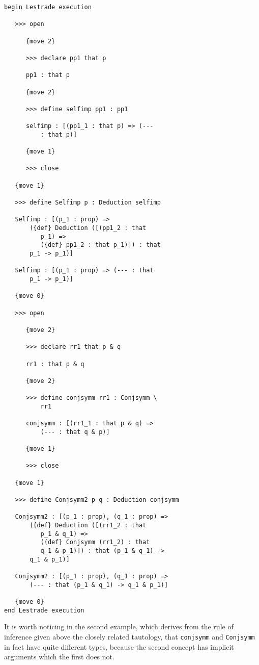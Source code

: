 \documentclass[12pt]{article}
\begin{document}
\begin{verbatim}
begin Lestrade execution

   >>> open

      {move 2}

      >>> declare pp1 that p

      pp1 : that p

      {move 2}

      >>> define selfimp pp1 : pp1

      selfimp : [(pp1_1 : that p) => (--- 
          : that p)]

      {move 1}

      >>> close

   {move 1}

   >>> define Selfimp p : Deduction selfimp

   Selfimp : [(p_1 : prop) => 
       ({def} Deduction ([(pp1_2 : that 
          p_1) => 
          ({def} pp1_2 : that p_1)]) : that 
       p_1 -> p_1)]

   Selfimp : [(p_1 : prop) => (--- : that 
       p_1 -> p_1)]

   {move 0}

   >>> open

      {move 2}

      >>> declare rr1 that p & q

      rr1 : that p & q

      {move 2}

      >>> define conjsymm rr1 : Conjsymm \
          rr1

      conjsymm : [(rr1_1 : that p & q) => 
          (--- : that q & p)]

      {move 1}

      >>> close

   {move 1}

   >>> define Conjsymm2 p q : Deduction conjsymm

   Conjsymm2 : [(p_1 : prop), (q_1 : prop) => 
       ({def} Deduction ([(rr1_2 : that 
          p_1 & q_1) => 
          ({def} Conjsymm (rr1_2) : that 
          q_1 & p_1)]) : that (p_1 & q_1) -> 
       q_1 & p_1)]

   Conjsymm2 : [(p_1 : prop), (q_1 : prop) => 
       (--- : that (p_1 & q_1) -> q_1 & p_1)]

   {move 0}
end Lestrade execution
\end{verbatim}

It is worth noticing in the second example, which derives from the rule of inference given above the closely related tautology,
that {\tt conjsymm} and {\tt Conjsymm} in fact have quite different types, because the second concept has implicit arguments which the first does not.
\end{document}
